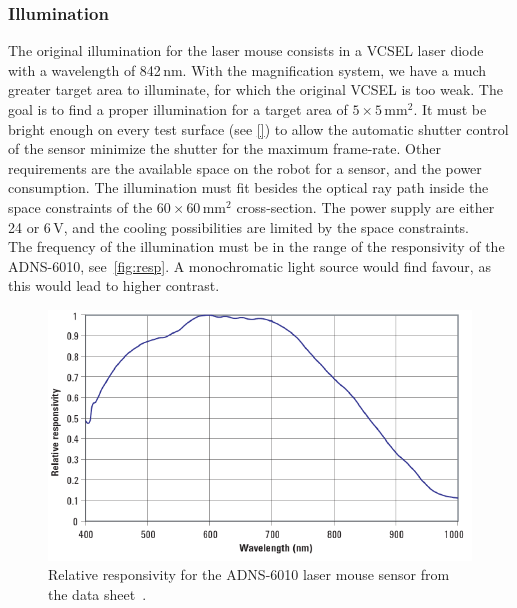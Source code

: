 \documentclass[12pt,a4paper]{article}
\begin{document}
\subsubsection{Illumination}

The original illumination for the laser mouse consists in a VCSEL laser diode with a wavelength of 842\,nm.
With the magnification system, we have a much greater target area to illuminate, for which the original VCSEL is too weak.
The goal is to find a proper illumination for a target area of $5\times5$\,mm$^2$.
It must be bright enough on every test surface (see \autoref{}) %
to allow the automatic shutter control of the sensor minimize the shutter for the maximum frame-rate. 
Other requirements are the available space on the robot for a sensor, and the power consumption. 
The illumination must fit besides the optical ray path inside the space constraints of the $60\times60$\,mm$^2$ cross-section.
The power supply are either 24 or 6\,V, and the cooling possibilities are limited by the space constraints.\\
The frequency of the illumination must be in the range of the responsivity of the ADNS-6010, see~\autoref{fig:resp}.
A monochromatic light source would find favour, as this would lead to higher contrast.

\begin{figure}[htbp]
\begin{center}
\includegraphics[width=0.6\columnwidth]{figures/responsivity}
\caption{\label{fig:resp}
Relative responsivity for the ADNS-6010 laser mouse sensor from the data sheet~\cite{adns}.
}
\end{center}
\end{figure}
\end{document}

